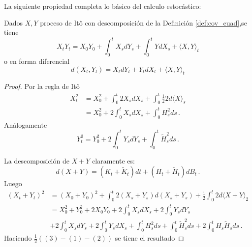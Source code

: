 La siguiente propiedad completa lo básico del calculo estocástico:
\begin{proposition}
Dados $X,Y$ proceso de It\^{o} con descomposición de la Definición \ref{def:cov_cuad},se tiene 
\begin{equation*}
    X_t Y_t = X_0 Y_0 + \int_{0}^{t} X_s dY_s + \int_{0}^{t} Y dX_s + \langle X,Y \rangle_t
\end{equation*}
o en forma diferencial 
\begin{equation*}
    d(X_t, Y_t) = X_t dY_t + Y_t dX_t + \langle X,Y \rangle_t
\end{equation*}
\end{proposition}
\begin{proof}
\gris
Por la regla de It\^{o} 
\begin{align*}
    X^2_{t} &= X^2_{0} + \int_{0}^{t} 2 X_s dX_s + \int_{0}^{t} \frac{1}{2} 2 d \langle X \rangle_s\\
            &= X^2_{0} + 2 \int_{0}^{t} X_s d X_s + \int_{0}^{t} H_s^2 ds \,.
\end{align*}
Análogamente
\begin{equation*}
    Y^2_{t} = Y^2_{0} + 2 \int_{0}^{t} Y_s d Y_s + \int_{0}^{t} \tilde{H}_s^2 ds \,.
\end{equation*}

La descomposición de $X + Y$ claramente es: 
\begin{equation*}
        d(X +Y) = (K_t + \tilde{K}_t) dt + (H_t + \tilde{H}_t) dB_t \,.
\end{equation*}
Luego 
\begin{align*}
    (X_t + Y_t)^2 & = (X_0 + Y_0)^2 + \int_{0}^{t} 2 (X_s + Y_s) d(X_s + Y_s) + \frac{1}{2} \int_{0}^{t} 2d \langle X + Y \rangle_2 \\
    &=X_0^2 + Y_0^2 + 2X_0Y_0 + 2 \int_{0}^{t} X_s dX_s + 2 \int_{0}^{t} Y_s dY_s  \\
    &+ 2 \int_{0}^{t} X_s dY_s + 2 \int_{0}^{t} Y_s dX_s + \int_{0}^{t} H_s^2 ds + \int_{0}^{t} \tilde{H}_s^2 ds + 2 \int_{0}^{t} H_s \tilde{H}_s ds \,.
\end{align*}
Haciendo $\frac{1}{2} ( (3) - (1) - (2) )$ se tiene el resultado \findem
\negro
\end{proof}

\newpage
